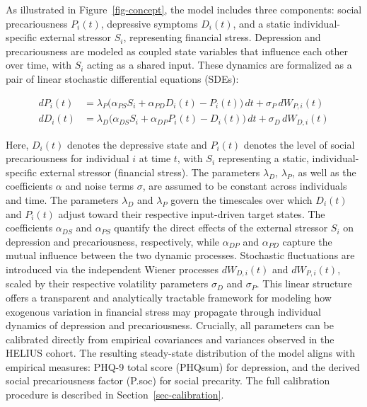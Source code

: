 \documentclass[
]{article}
\begin{document}
As illustrated in Figure~\ref{fig-concept}, the model includes three
components: social precariousness \(P_i(t)\), depressive symptoms
\(D_i(t)\), and a static individual-specific external stressor \(S_i\),
representing financial stress. Depression and precariousness are modeled
as coupled state variables that influence each other over time, with
\(S_i\) acting as a shared input. These dynamics are formalized as a
pair of linear stochastic differential equations (SDEs):

\[
\begin{aligned}
dP_i(t) &= \lambda_P \big( \alpha_{PS} S_i + \alpha_{PD} D_i(t) - P_i(t) \big) \, dt + \sigma_P \, dW_{P,i}(t) \\
dD_i(t) &= \lambda_D \big( \alpha_{DS} S_i + \alpha_{DP} P_i(t) - D_i(t) \big) \, dt + \sigma_D \, dW_{D,i}(t)
\end{aligned}
\]

Here, \(D_i(t)\) denotes the depressive state and \(P_i(t)\) denotes the
level of social precariousness for individual \(i\) at time \(t\), with
\(S_i\) representing a static, individual-specific external stressor
(financial stress). The parameters \(\lambda_D\), \(\lambda_P\), as well
as the coefficients \(\alpha\) and noise terms \(\sigma\), are assumed
to be constant across individuals and time. The parameters \(\lambda_D\)
and \(\lambda_P\) govern the timescales over which \(D_i(t)\) and
\(P_i(t)\) adjust toward their respective input-driven target states.
The coefficients \(\alpha_{DS}\) and \(\alpha_{PS}\) quantify the direct
effects of the external stressor \(S_i\) on depression and
precariousness, respectively, while \(\alpha_{DP}\) and \(\alpha_{PD}\)
capture the mutual influence between the two dynamic processes.
Stochastic fluctuations are introduced via the independent Wiener
processes \(dW_{D,i}(t)\) and \(dW_{P,i}(t)\), scaled by their
respective volatility parameters \(\sigma_D\) and \(\sigma_P\). This
linear structure offers a transparent and analytically tractable
framework for modeling how exogenous variation in financial stress may
propagate through individual dynamics of depression and precariousness.
Crucially, all parameters can be calibrated directly from empirical
covariances and variances observed in the HELIUS cohort. The resulting
steady-state distribution of the model aligns with empirical measures:
PHQ-9 total score (PHQsum) for depression, and the derived social
precariousness factor (P.soc) for social precarity. The full calibration
procedure is described in Section~\ref{sec-calibration}.
\end{document}
